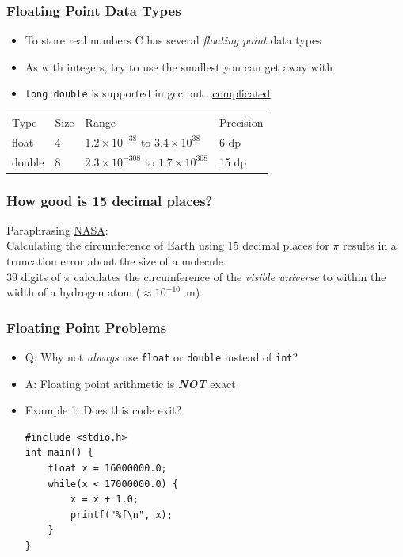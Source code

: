 \documentclass[14pt]{beamer}
\begin{document}
\begin{frame}[fragile]
\frametitle{Floating Point Data Types}
\begin{itemize}
\item To store real numbers C has several \textit{floating point} data types
\item As with integers, try to use the smallest you can get away with
\item \texttt{long double} is supported in gcc but...\underline{\href{https://en.wikipedia.org/wiki/Long_double}{complicated}}
\end{itemize}

\begin{table}[] \small
\begin{tabular}{llll}
Type        & Size & Range                                             & Precision \\
float       & 4    & $1.2\times 10^{-38}$ to $3.4 \times 10^{38}$      & 6 dp      \\
double      & 8    & $2.3 \times 10^{-308}$ to $1.7 \times 10^{308}$     & 15 dp     \\   
\end{tabular}
\end{table}
\end{frame}

\begin{frame}
\frametitle{How good is 15 decimal places?}
Paraphrasing \underline{\href{https://www.jpl.nasa.gov/edu/news/2016/3/16/how-many-decimals-of-pi-do-we-really-need/}{NASA}}: \\
\vspace{5mm}
Calculating the circumference of Earth using 15 decimal places for $\pi$ results in a truncation error about the size of a molecule.\\
\vspace{5mm}
39 digits of $\pi$ calculates the circumference of the \textit{visible universe} to within the width of a hydrogen atom ($\approx10^{-10}$~m).

\end{frame}

\begin{frame}[fragile]
\frametitle{Floating Point Problems}
\begin{itemize}
\item Q: Why not \textit{always} use \texttt{float} or \texttt{double} instead of \texttt{int}?
\item A: Floating point arithmetic is \textbf{\textit{NOT}} exact
\item Example 1: Does this code exit?
\begin{lstlisting}[style=CStyle]
#include <stdio.h>
int main() {
	float x = 16000000.0;
	while(x < 17000000.0) {
		x = x + 1.0;
		printf("%f\n", x);
	}
}
\end{lstlisting}
\end{itemize}
\end{frame}
\end{document}
